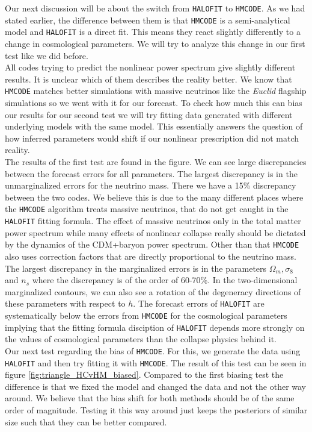 \documentclass[oneside]{book}
\newcommand*{\Euclid}{\textit{Euclid}\xspace}
\newcommand*{\halofit}{\texttt{HALOFIT}\xspace}
\newcommand*{\hmcode}{\texttt{HMCODE}\xspace}
\begin{document}
\noindent Our next discussion will be about the switch from \halofit to \hmcode. As we had stated earlier, the difference between them is that \hmcode is a semi-analytical model and \halofit is a direct fit. This means they react slightly differently to a change in cosmological parameters. We will try to analyze this change in our first test like we did before.\\
All codes trying to predict the nonlinear power spectrum give slightly different results. It is unclear which of them describes the reality better. We know that \hmcode matches better simulations with massive neutrinos like the \Euclid flagship simulations so we went with it for our forecast. To check how much this can bias our results for our second test we will try fitting data generated with different underlying models with the same model. This essentially answers the question of how inferred parameters would shift if our nonlinear prescription did not match reality.\\
The results of the first test are found in the figure. We can see large discrepancies between the forecast errors for all parameters. The largest discrepancy is in the unmarginalized errors for the neutrino mass. There we have a  15\% discrepancy between the two codes. We believe this is due to the many different places where the \hmcode algorithm treats massive neutrinos, that do not get caught in the \halofit fitting formula. The effect of massive neutrinos only in the total matter power spectrum while many effects of nonlinear collapse really should be dictated by the dynamics of the CDM+baryon power spectrum. Other than that \hmcode also uses correction factors that are directly proportional to the neutrino mass.\\
The largest discrepancy in the marginalized errors is in the parameters $\Omega_m,\sigma_8$ and $n_s$ where the discrepancy is of the order of 60-70\%. In the two-dimensional marginalized contours, we can also see a rotation of the degeneracy directions of these parameters with respect to $h$. The forecast errors of \halofit are systematically below the errors from \hmcode for the cosmological parameters implying that the fitting formula disciption of \halofit depends more strongly on the values of cosmological parameters than the collapse physics behind it.\\
Our next test regarding the bias of \hmcode. For this, we generate the data using \halofit and then try fitting it with \hmcode. The result of this test can be seen in figure \ref{fig:triangle_HCvHM_biased}. Compared to the first biasing test the difference is that we fixed the model and changed the data and not the other way around. We believe that the bias shift for both methods should be of the same order of magnitude. Testing it this way around just keeps the posteriors of similar size such that they can be better compared.\\
\end{document}
